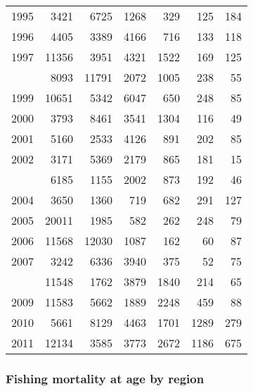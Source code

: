 \documentclass[
]{article}
\begin{document}
\begin{longtable}[t]{lrrrrrr}
1995 & 3421 & 6725 & 1268 & 329 & 125 & 184\\
1996 & 4405 & 3389 & 4166 & 716 & 133 & 118\\
1997 & 11356 & 3951 & 4321 & 1522 & 169 & 125\\
\addlinespace
1998 & 8093 & 11791 & 2072 & 1005 & 238 & 55\\
1999 & 10651 & 5342 & 6047 & 650 & 248 & 85\\
2000 & 3793 & 8461 & 3541 & 1304 & 116 & 49\\
2001 & 5160 & 2533 & 4126 & 891 & 202 & 85\\
2002 & 3171 & 5369 & 2179 & 865 & 181 & 15\\
\addlinespace
2003 & 6185 & 1155 & 2002 & 873 & 192 & 46\\
2004 & 3650 & 1360 & 719 & 682 & 291 & 127\\
2005 & 20011 & 1985 & 582 & 262 & 248 & 79\\
2006 & 11568 & 12030 & 1087 & 162 & 60 & 87\\
2007 & 3242 & 6336 & 3940 & 375 & 52 & 75\\
\addlinespace
2008 & 11548 & 1762 & 3879 & 1840 & 214 & 65\\
2009 & 11583 & 5662 & 1889 & 2248 & 459 & 88\\
2010 & 5661 & 8129 & 4463 & 1701 & 1289 & 279\\
2011 & 12134 & 3585 & 3773 & 2672 & 1186 & 675\\*
\end{longtable}

\subsubsection{Fishing mortality at age by
region}\label{fishing-mortality-at-age-by-region}
\end{document}
